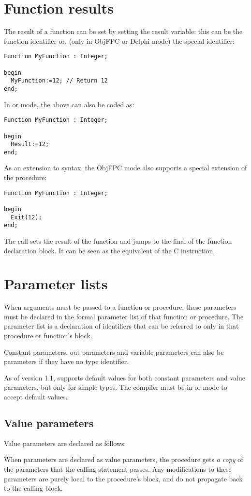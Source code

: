 \section{Function results}
The result of a function can be set by setting the result variable:
this can be the function identifier or, (only in ObjFPC or Delphi mode) 
the special  identifier:
\begin{verbatim}
Function MyFunction : Integer;

begin
  MyFunction:=12; // Return 12
end;
\end{verbatim}
In  or  mode, the above can also be coded as:
\begin{verbatim}
Function MyFunction : Integer;

begin
  Result:=12;
end;
\end{verbatim}
As an extension to \delphi syntax, the ObjFPC mode also supports a special
extension of the  procedure:
\begin{verbatim}
Function MyFunction : Integer;

begin
  Exit(12);
end;
\end{verbatim}
The  call sets the result of the function and jumps to the final
 of the function declaration block. It can be seen as the equivalent 
of the C  instruction.

\section{Parameter lists}
\label{se:Parameters}
When arguments must be passed to a function or procedure, these parameters
must be declared in the formal parameter list of that function or procedure.
The parameter list is a declaration of identifiers that can be referred to
only in that procedure or function's block.

Constant parameters, out parameters and variable parameters can also be 
parameters if they have no type
identifier.

As of version 1.1, \fpc supports default values for both constant parameters
and value parameters, but only for simple types. The compiler must be in
 or  mode to accept default values. 

\subsection{Value parameters}
Value parameters are declared as follows:

When parameters are declared as value parameters, the procedure gets {\em
a copy} of the parameters that the calling statement passes. Any modifications
to these parameters are purely local to the procedure's block, and do not
propagate back to the calling block.

